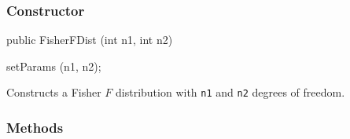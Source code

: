 \subsubsection* {Constructor}

\begin{code}

   public FisherFDist (int n1, int n2)\begin{hide} {
      setParams (n1, n2);
   }\end{hide}
\end{code}
\begin{tabb}
   Constructs a Fisher $F$ distribution with \texttt{n1} and \texttt{n2} degrees of freedom.
\end{tabb}

\subsubsection* {Methods}


